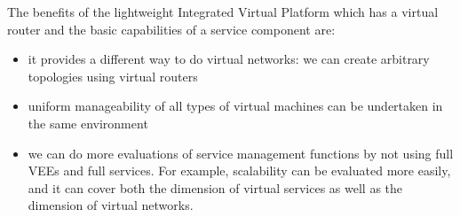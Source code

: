 
The benefits of the lightweight Integrated Virtual Platform which has
a virtual router and the
basic capabilities of a service component are:
\begin{itemize}
\item it provides a different way to do virtual networks: we can
  create arbitrary topologies using virtual routers 
\item uniform manageability of all types of virtual machines can be
  undertaken in the same environment
\item we can do more evaluations of service management functions by
  not using full VEEs and full services. For example, scalability can
  be evaluated more easily, and it can cover both 
  the dimension of virtual services as well as the dimension of
  virtual networks.

\end{itemize}
